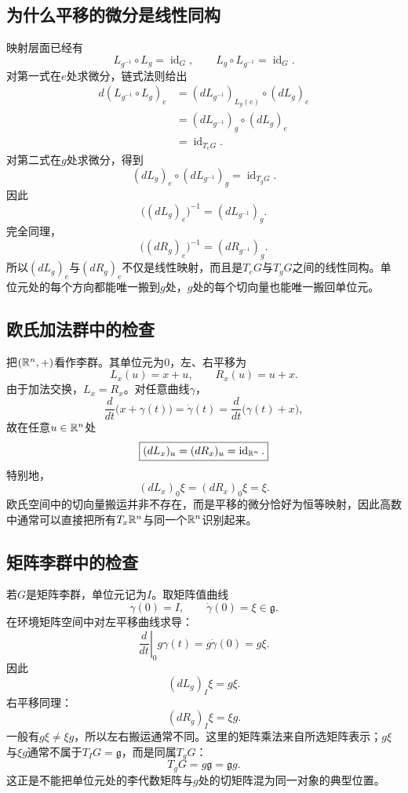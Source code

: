 \subsection{为什么平移的微分是线性同构}

映射层面已经有
\[
    L_{g^{-1}}\circ L_g=\operatorname{id}_G,
    \qquad
    L_g\circ L_{g^{-1}}=\operatorname{id}_G.
\]
对第一式在$e$处求微分，链式法则给出
\[
\begin{aligned}
    d(L_{g^{-1}}\circ L_g)_e
    &=(dL_{g^{-1}})_{L_g(e)}\circ(dL_g)_e\\
    &=(dL_{g^{-1}})_g\circ(dL_g)_e\\
    &=\operatorname{id}_{T_eG}.
\end{aligned}
\]
对第二式在$g$处求微分，得到
\[
    (dL_g)_e\circ(dL_{g^{-1}})_g
    =\operatorname{id}_{T_gG}.
\]
因此
\[
    \boxed{
    \bigl((dL_g)_e\bigr)^{-1}
    =(dL_{g^{-1}})_g.
    }
\]
完全同理，
\[
    \boxed{
    \bigl((dR_g)_e\bigr)^{-1}
    =(dR_{g^{-1}})_g.
    }
\]
所以$(dL_g)_e$与$(dR_g)_e$不仅是线性映射，而且是$T_eG$与$T_gG$之间的线性同构。单位元处的每个方向都能唯一搬到$g$处，$g$处的每个切向量也能唯一搬回单位元。

\subsection{欧氏加法群中的检查}

把$(\mathbb{R}^n,+)$看作李群。其单位元为$0$，左、右平移为
\[
    L_x(u)=x+u,
    \qquad
    R_x(u)=u+x.
\]
由于加法交换，$L_x=R_x$。对任意曲线$\gamma$，
\[
    \frac{d}{dt}\bigl(x+\gamma(t)\bigr)
    =\dot\gamma(t)
    =\frac{d}{dt}\bigl(\gamma(t)+x\bigr),
\]
故在任意$u\in\mathbb{R}^n$处
\[
    \boxed{
    (dL_x)_u=(dR_x)_u
    =\operatorname{id}_{\mathbb{R}^n}.
    }
\]
特别地，
\[
    (dL_x)_0\xi
    =(dR_x)_0\xi
    =\xi.
\]
欧氏空间中的切向量搬运并非不存在，而是平移的微分恰好为恒等映射，因此高数中通常可以直接把所有$T_x\mathbb{R}^n$与同一个$\mathbb{R}^n$识别起来。

\subsection{矩阵李群中的检查}

若$G$是矩阵李群，单位元记为$I$。取矩阵值曲线
\[
    \gamma(0)=I,
    \qquad
    \dot\gamma(0)=\xi\in\mathfrak g.
\]
在环境矩阵空间中对左平移曲线求导：
\[
    \left.\frac{d}{dt}\right|_0g\gamma(t)
    =g\dot\gamma(0)
    =g\xi.
\]
因此
\[
    \boxed{
    (dL_g)_I\xi=g\xi.
    }
\]
右平移同理：
\[
    \boxed{
    (dR_g)_I\xi=\xi g.
    }
\]
一般有$g\xi\neq\xi g$，所以左右搬运通常不同。这里的矩阵乘法来自所选矩阵表示；$g\xi$与$\xi g$通常不属于$T_IG=\mathfrak g$，而是同属$T_gG$：
\[
    T_gG=g\mathfrak g=\mathfrak g g.
\]
这正是不能把单位元处的李代数矩阵与$g$处的切矩阵混为同一对象的典型位置。

